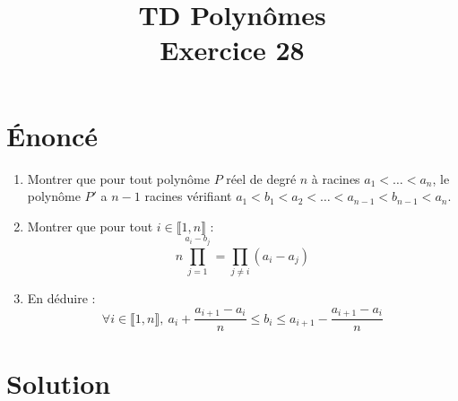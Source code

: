 \documentclass[french]{article}
\title{TD Polynômes \\ Exercice 28}
\date{}
\begin{document}
\maketitle

\section{Énoncé}
\begin{enumerate}
	\item Montrer que pour tout polynôme $P$ réel de degré $n$ à racines $a_1<\ldots<a_n$, le polynôme $P'$ a $n-1$ racines vérifiant $a_1<b_1<a_2<\ldots<a_{n-1}<b_{n-1}<a_n$.
	\item Montrer que pour tout $i\in\llbracket1,n\rrbracket$ : $$n\prod_{j=1}^{a_i-b_j}=\prod_{j\ne i}(a_i-a_j)$$
	\item En déduire : $$\forall i\in\llbracket1,n\rrbracket,\ a_i+\frac{a_{i+1}-a_i}{n}\leqslant b_i\leqslant a_{i+1}-\frac{a_{i+1}-a_i}{n}$$
\end{enumerate}
\section{Solution}
\end{document}
